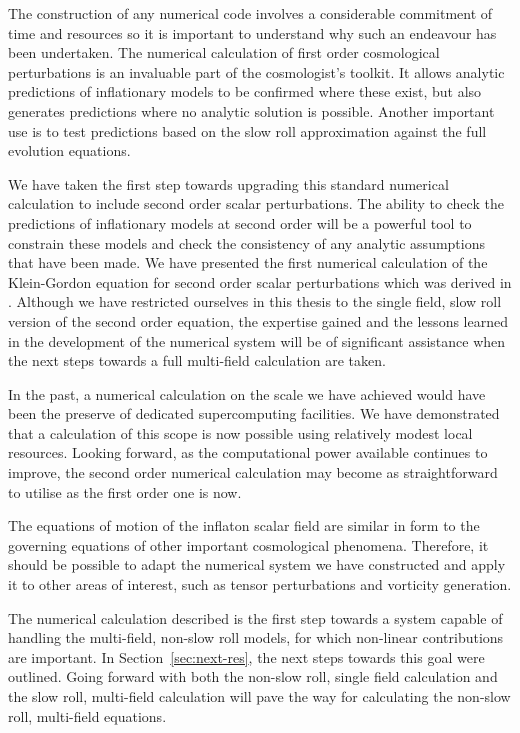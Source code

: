 The construction of any numerical code involves a considerable commitment of time
and resources so it is important to understand why such an endeavour has been
undertaken. 
The numerical calculation of first order cosmological perturbations is an invaluable
part of the cosmologist's toolkit. It allows analytic predictions of inflationary
models to be confirmed where these exist, but also generates predictions where no
analytic solution is possible. Another important use is to test predictions based
on the slow roll approximation  against the full evolution equations. 

We have taken the first step towards upgrading this standard numerical calculation to
include second order scalar perturbations. 
% 
The ability to check the predictions of inflationary models at second order will
be a powerful tool to constrain these models and check the consistency of any
analytic assumptions that have been made. 
% 
We have presented the
first numerical calculation of the Klein-Gordon equation for second order scalar
perturbations which was derived in . Although we have restricted
ourselves in this thesis to the single field, slow roll version of the second order
equation,
the expertise gained and the lessons learned in the development of the numerical
system will be of significant assistance when the next steps towards a full
multi-field calculation are taken. 
% 


In the past, a numerical calculation on the scale we have achieved would have been
the preserve of dedicated supercomputing facilities. We have demonstrated that a
calculation of this scope is now possible using relatively modest local resources.
Looking forward, as the computational power available continues to improve, the
second order numerical calculation may become as straightforward to utilise as the
first order one is now. 

The equations of motion of the inflaton scalar field are similar in form to the
governing equations of other important cosmological phenomena. Therefore, it should
be possible to adapt the numerical system we have constructed and apply it to other
areas of interest, such as tensor perturbations and vorticity generation. 


The numerical calculation described is the first step towards a system capable of
handling the multi-field, non-slow roll models, for which non-linear contributions
are important. In Section~\ref{sec:next-res}, the next steps towards this goal were
outlined. 
% 
Going forward with both the non-slow roll, single field calculation and the slow
roll, multi-field calculation will pave the way for calculating the
non-slow roll, multi-field equations.
% 

